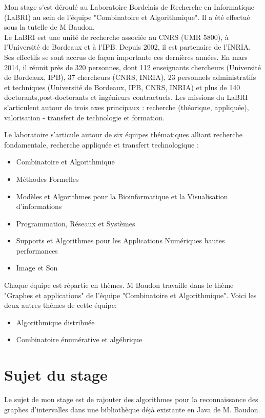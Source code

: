 \documentclass[12pt, a4paper]{report}
\begin{document}
Mon stage s'est déroulé au Laboratoire Bordelais de Recherche en Informatique (LaBRI) au sein de l'équipe "Combinatoire et Algorithmique". Il a été effectué sous la tutelle de M Baudon.
\\

Le LaBRI est une unité de recherche associée au CNRS (UMR 5800), à l'Université de Bordeaux et à l'IPB. Depuis 2002, il est partenaire de l'INRIA. Ses effectifs se sont accrus de façon importante ces dernières années. En mars 2014, il réunit près de 320 personnes, dont 112 enseignants chercheurs (Université de Bordeaux, IPB), 37 chercheurs (CNRS, INRIA), 23 personnels administratifs et techniques (Université de Bordeaux, IPB, CNRS, INRIA) et plus de 140 doctorants,post-doctorants et ingénieurs contractuels. Les missions du LaBRI s'articulent autour de trois axes principaux : recherche (théorique, appliquée), valorisation - transfert de technologie et formation. 


Le laboratoire s'articule autour de six équipes thématiques alliant recherche fondamentale, recherche appliquée et transfert technologique :
\begin{itemize}
\item Combinatoire et Algorithmique
\item Méthodes Formelles
\item Modèles et Algorithmes pour la Bioinformatique et la Visualisation d'informations
\item Programmation, Réseaux et Systèmes
\item Supports et Algorithmes pour les Applications Numériques hautes performances 
\item Image et Son
\end{itemize}

Chaque équipe est répartie en thèmes. M Baudon travaille dans le thème "Graphes et applications" de l'équipe "Combinatoire et Algorithmique". Voici les deux autres thèmes de cette équipe:
\begin{itemize}
\item Algorithmique distribuée
\item Combinatoire énumérative et algébrique
\end{itemize}

\section{Sujet du stage}
	Le sujet de mon stage est de rajouter des algorithmes pour la  reconnaissance des graphes d'intervalles dans une bibliothèque déjà existante en Java de M. Baudon.
	
\end{document}
